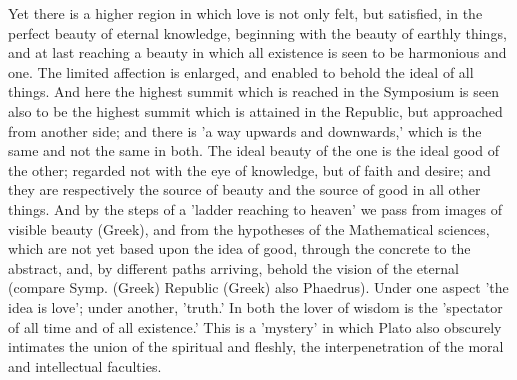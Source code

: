 \documentclass[11pt,letter]{article}
\begin{document}
\par  Yet there is a higher region in which love is not only felt, but satisfied, in the perfect beauty of eternal knowledge, beginning with the beauty of earthly things, and at last reaching a beauty in which all existence is seen to be harmonious and one. The limited affection is enlarged, and enabled to behold the ideal of all things. And here the highest summit which is reached in the Symposium is seen also to be the highest summit which is attained in the Republic, but approached from another side; and there is 'a way upwards and downwards,' which is the same and not the same in both. The ideal beauty of the one is the ideal good of the other; regarded not with the eye of knowledge, but of faith and desire; and they are respectively the source of beauty and the source of good in all other things. And by the steps of a 'ladder reaching to heaven' we pass from images of visible beauty (Greek), and from the hypotheses of the Mathematical sciences, which are not yet based upon the idea of good, through the concrete to the abstract, and, by different paths arriving, behold the vision of the eternal (compare Symp. (Greek) Republic (Greek) also Phaedrus). Under one aspect 'the idea is love'; under another, 'truth.' In both the lover of wisdom is the 'spectator of all time and of all existence.' This is a 'mystery' in which Plato also obscurely intimates the union of the spiritual and fleshly, the interpenetration of the moral and intellectual faculties.
\end{document}
